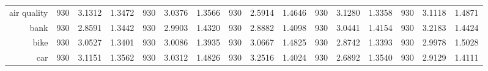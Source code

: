 \begin{table}[htbp]
{\begin{tabular}{rccccccccccccccc}
			air quality                         & 930                                 & 3.1312                                                                    & 1.3472          & 930                                & 3.0376                                                                             & 1.3566          & 930                                & \cellcolor[rgb]{ .776,  .937,  .808}\textcolor[rgb]{ 0,  .38,  0}{2.5914} & 1.4646          & 930                                & 3.1280                                                                    & 1.3358          & 930                                    & 3.1118                                                                    & 1.4871          \\
			bank                                & 930                                 & \cellcolor[rgb]{ .776,  .937,  .808}\textcolor[rgb]{ 0,  .38,  0}{2.8591} & 1.3442          & 930                                & 2.9903                                                                             & 1.4320          & 930                                & 2.8882                                                                    & 1.4098          & 930                                & 3.0441                                                                    & 1.4154          & 930                                    & 3.2183                                                                    & 1.4424          \\
			bike                                & 930                                 & 3.0527                                                                    & 1.3401          & 930                                & 3.0086                                                                             & 1.3935          & 930                                & 3.0667                                                                    & 1.4825          & 930                                & \cellcolor[rgb]{ .776,  .937,  .808}\textcolor[rgb]{ 0,  .38,  0}{2.8742} & 1.3393          & 930                                    & 2.9978                                                                    & 1.5028          \\
			car                                 & 930                                 & 3.1151                                                                    & 1.3562          & 930                                & 3.0312                                                                             & 1.4826          & 930                                & 3.2516                                                                    & 1.4024          & 930                                & \cellcolor[rgb]{ .776,  .937,  .808}\textcolor[rgb]{ 0,  .38,  0}{2.6892} & 1.3540          & 930                                    & 2.9129                                                                    & 1.4111          \\

\end{tabular}}
\end{table}

